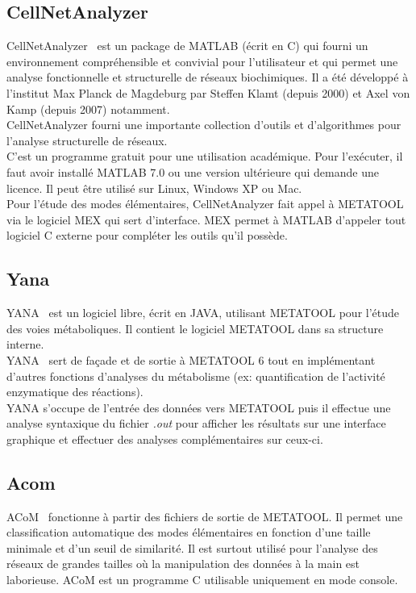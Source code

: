\subsection{CellNetAnalyzer}
CellNetAnalyzer~\cite{cna:url} est un package de MATLAB (écrit en \textsc{C}) qui fourni un environnement compréhensible et convivial pour l'utilisateur et qui permet une analyse fonctionnelle et structurelle de réseaux biochimiques. Il a été développé à l'institut Max Planck de Magdeburg par Steffen Klamt (depuis 2000) et Axel von Kamp (depuis 2007) notamment.\\
CellNetAnalyzer fourni une importante collection d'outils et d'algorithmes pour l'analyse structurelle de réseaux.\\
C'est un programme gratuit pour une utilisation académique. Pour l'exécuter, il faut avoir installé MATLAB 7.0 ou une version ultérieure qui demande une licence. Il peut être utilisé sur Linux, Windows XP ou Mac.\\
Pour l'étude des modes élémentaires, CellNetAnalyzer fait appel à METATOOL via le logiciel MEX qui sert d'interface. MEX permet à MATLAB d'appeler tout logiciel \textsc{C} externe pour compléter les outils qu'il possède.

\subsection{Yana}
YANA~\cite{yana} est un logiciel libre, écrit en JAVA, utilisant METATOOL pour l'étude
des voies métaboliques. Il contient le logiciel METATOOL dans sa structure interne. \\
YANA~\cite{yanasq:url} sert de façade et de sortie à METATOOL 6 tout en implémentant d'autres fonctions d'analyses du métabolisme (ex: quantification de l'activité enzymatique des réactions).\\ YANA s'occupe de l'entrée des données vers METATOOL puis il effectue une analyse syntaxique du fichier \textit{.out} pour afficher les résultats sur une interface graphique et effectuer des analyses complémentaires sur ceux-ci.

\subsection{Acom}
ACoM~\cite{acom} fonctionne à partir des fichiers de sortie de METATOOL. Il permet une classification automatique des modes élémentaires en fonction d'une taille minimale et d'un seuil de similarité. Il est surtout utilisé pour l'analyse des réseaux de grandes tailles où la manipulation des données à la main est laborieuse. ACoM est un programme
C utilisable uniquement en mode console.

